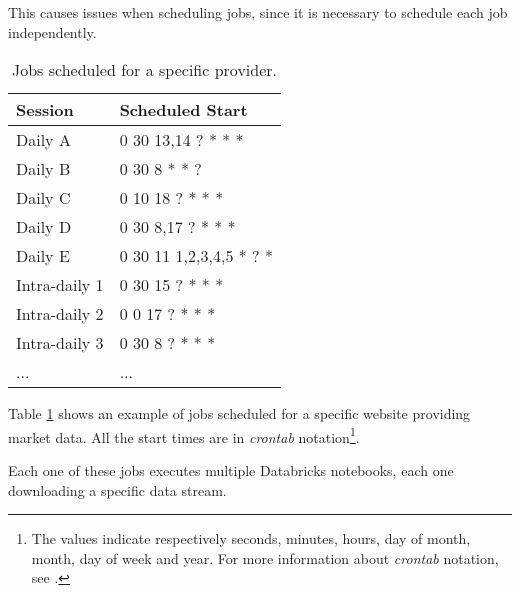     This causes issues when scheduling jobs, since it is necessary to schedule each job independently.
    \begin{table}
        \centering
        \begin{tabular}{|l|l|}
            \toprule
            Session          & Scheduled Start           \\
            \midrule
            Daily A          & 0 30 13,14 ? * * *        \\
            Daily B          & 0 30 8 * * ?              \\
            Daily C          & 0 10 18 ? * * *           \\
            Daily D          & 0 30 8,17 ? * * *         \\
            Daily E          & 0 30 11 1,2,3,4,5 * ? *   \\
            Intra-daily 1    & 0 30 15 ? * * *           \\
            Intra-daily 2    & 0 0 17 ? * * *            \\
            Intra-daily 3    & 0 30 8 ? * * *            \\
            ...              & ...                       \\
             \bottomrule
        \end{tabular}
        \caption{Jobs scheduled for a specific provider.}
        \label{tab:gme_job_schedules}
    \end{table}
    
    Table \ref{tab:gme_job_schedules} shows an example of jobs scheduled for a specific website providing market data.
    All the start times are in \textit{crontab} notation\footnote{
        The values indicate respectively seconds, minutes, hours, day of month, month, day of week and year.
        For more information about \textit{crontab} notation, see \cite{bib:crontab:notation}.
    }.
    
    Each one of these jobs executes multiple Databricks notebooks, each one downloading a specific data stream.